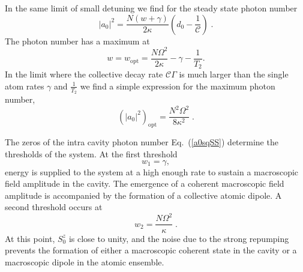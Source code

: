 \documentclass[aps,
twocolumn,
showpacs,
superscriptaddress,groupedaddress]{revtex4}
\begin{document}
In the same limit of small detuning we find for the steady state photon
number
\begin{equation}
|a_0|^2=\frac{N(w+\gamma)}{2 \kappa} (d_0 - \frac{1}{\mathcal{C}})\;.
\label{a0sqSS}
\end{equation}
The photon number has a maximum at
\begin{equation}
w=w_{\mathrm{opt}} = \frac{N \Omega^2}{2\kappa} - \gamma - \frac{1}{T_2}.
\label{wopt}
\end{equation}
In the limit where the collective decay rate $\mathcal{C}\Gamma$ is
much larger than the single atom rates $\gamma$ and $\frac{1}{T_2}$ we
find a simple expression for the maximum photon number,
\begin{equation}
(|a_0|^2)_{\mathrm{opt}}= \frac{N^2 \Omega^2}{8\kappa^2}\;.
\label{adaopt}
\end{equation}

The zeros of the intra cavity photon number Eq.~(\ref{a0sqSS}) determine
the thresholds of the system.  At the first threshold
\begin{equation}
w_1 = \gamma,
\label{FirstThreshold}
\end{equation} 
energy is supplied to the system at a high enough rate to sustain a
macroscopic field amplitude in the cavity.  The emergence of a coherent
macroscopic field amplitude is accompanied by the formation of a
collective atomic dipole.  A second threshold occurs at
\begin{equation}
w_2 =  \frac{N \Omega^2}{\kappa}\;.
\end{equation} 
At this point, $S_0^{z}$ is close to unity, and the noise due to the
strong repumping prevents the formation of either a macroscopic
coherent state in the cavity or a macroscopic dipole in the atomic
ensemble.
\end{document}
